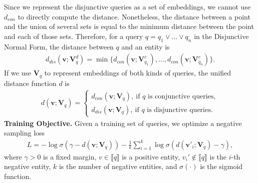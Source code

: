 \documentclass{article}
\newcommand{\ee}{\mathbf{v}}
\newcommand{\qe}{\mathbf{V}_q}
\begin{document}
Since we represent the disjunctive queries as a set of embeddings, we cannot use $d_{con}$ to directly compute the distance. Nonetheless, the distance between a point and the union of several sets is equal to the minimum distance between the point and each of those sets. Therefore, for a query $q=q_1\lor \dots\lor q_n$ in the Disjunctive Normal Form, the distance between $q$ and an entity is
\begin{align*}
    d_{dis}(\textbf{v};\textbf{V}_{q}^d)=\min\{d_{con}(\textbf{v};\textbf{V}_{q_1}^c),\dots,d_{con}(\textbf{v};\textbf{V}_{q_n}^c)\}.
\end{align*}
If we use $\textbf{V}_q$ to represent embeddings of both kinds of queries, the unified distance function $d$ is
\vspace{-1mm}
\begin{align*}
     d(\ee;\qe)=
     \begin{cases}
        d_{con}(\ee;\qe),\ \text{if }q \text{ is conjunctive queries},\\
        d_{dis}(\ee;\qe),\ \text{if }q \text{ is disjunctive queries}.
     \end{cases}
\end{align*}
\textbf{Training Objective.} Given a training set of queries, we optimize a negative sampling loss
\begin{align*}
    L=-\log\sigma(\gamma-d(\ee;\qe))-\frac{1}{k}\sum\nolimits_{i=1}^k\log\sigma(d(\ee'_i;\qe)-\gamma),
\end{align*}
where $\gamma>0$ is a fixed margin, $v\in\llbracket q\rrbracket$ is a positive entity, $v_i'\notin \llbracket q \rrbracket$ is the $i$-th negative entity, $k$ is the number of negative entities, and $\sigma(\cdot)$ is the sigmoid function.
\end{document}
